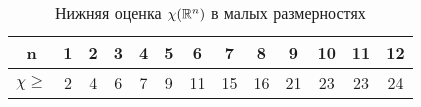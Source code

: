 \begin{table}[h]\centering
\caption{Нижняя оценка $\chi(\mathbb R^n)$ в малых размерностях}
\begin{tabular}{|c|c|c|c|c|c|c|c|c|c|c|c|c|}
\hline
n &           1 & 2 & 3 & 4 & 5 & 6 &   7 & 8 & 9 & 10   & 11 & 12 \\ \hline
$\chi \geq$ & 2 & 4 & 6 & 7 & 9 & 11 & 15 & 16 & 21 & 23 & 23 & 24 \\ \hline
\end{tabular}
\end{table}
